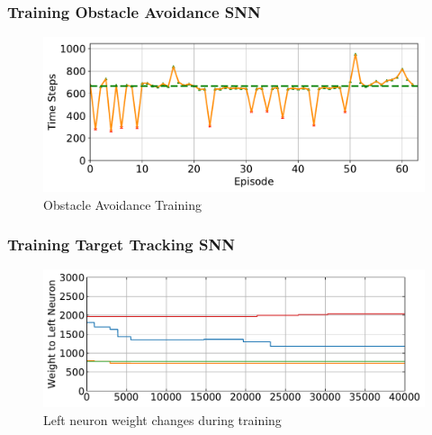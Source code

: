 \begin{frame}
	\frametitle{Training Obstacle Avoidance SNN}
	\begin{figure}
		\centering
		\includegraphics[width=\textwidth]{img/success_oa.pdf}
		\caption{Obstacle Avoidance Training}
		\label{fig:oa_success}
	\end{figure}
\end{frame}

\begin{frame}
	\frametitle{Training Target Tracking SNN}
	\begin{figure}
		\centering
		\includegraphics[width=\textwidth]{img/weight_change_left_oa.pdf}
		\caption{Left neuron weight changes during training}
		\label{fig:oa_weight_changes_left}
	\end{figure}
\end{frame}

